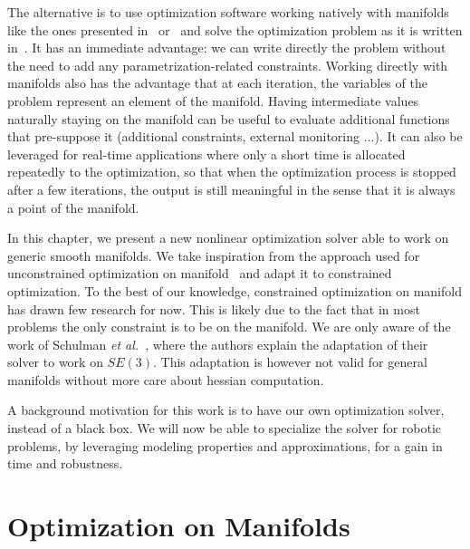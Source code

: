 The alternative is to use optimization software working natively with manifolds like the ones presented in~\cite{brossette:Humanoids:2015} or~\cite{absil:book:2008} and solve the optimization problem as it is written in~.
It has an immediate advantage: we can write directly the problem without the need to add any parametrization-related constraints.
Working directly with manifolds also has the advantage that at each iteration, the variables of the problem represent an element of the manifold.
Having intermediate values naturally staying on the manifold can be useful to evaluate additional functions that pre-suppose it (additional constraints, external monitoring $\ldots$).
It can also be leveraged for real-time applications where only a short time is allocated repeatedly to the optimization, so that when the optimization process is stopped after a few iterations, the output is still meaningful in the sense that it is always a point of the manifold.

In this chapter, we present a new nonlinear optimization solver able to work on generic smooth manifolds.
We take inspiration from the approach used for unconstrained optimization on manifold~\cite{absil:book:2008} and adapt it to constrained optimization.
To the best of our knowledge, constrained optimization on manifold has drawn few research for now.
This is likely due to the fact that in most problems the only constraint is to be on the manifold.%
We are only aware of the work of Schulman \emph{et al.}~\cite{Schulman2014}, where the authors explain the adaptation of their solver to work on $SE(3)$.
This adaptation is however not valid for general manifolds without more care about hessian computation.

A background motivation for this work is to have our own optimization solver, instead of a black box.
We will now be able to specialize the solver for robotic problems, by leveraging modeling properties and approximations, for a gain in time and robustness.

\section{Optimization on Manifolds}
\label{sec:optimization_on_manifolds}

